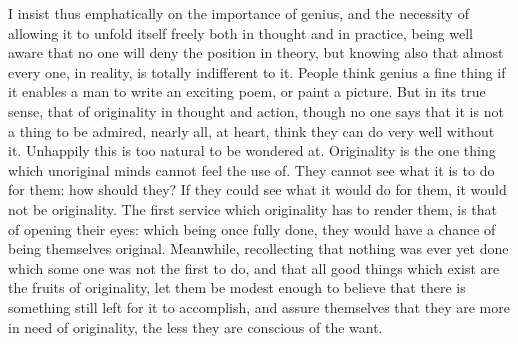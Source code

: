 \documentclass[12pt]{report}
\begin{document}
I insist thus emphatically on the importance of genius, and the necessity of allowing it to unfold itself freely both in thought and in practice, being well aware that no one will deny the position in theory, but knowing also that almost every one, in reality, is totally indifferent to it. People think genius a fine thing if it enables a man to write an exciting poem, or paint a picture. But in its true sense, that of originality in thought and action, though no one says that it is not a thing to be admired, nearly all, at heart, think they can do very well without it. Unhappily this is too natural to be wondered at. Originality is the one thing which unoriginal minds cannot feel the use of. They cannot see what it is to do for them: how should they? If they could see what it would do for them, it would not be originality. The first service which originality has to render them, is that of opening their eyes: which being once fully done, they would have a chance of being themselves original. Meanwhile, recollecting that nothing was ever yet done which some one was not the first to do, and that all good things which exist are the fruits of originality, let them be modest enough to believe that there is something still left for it to accomplish, and assure themselves that they are more in need of originality, the less they are conscious of the want.
\end{document}
